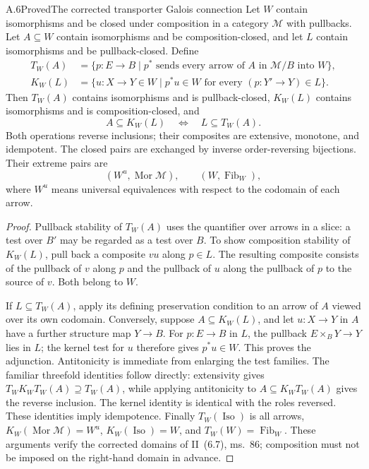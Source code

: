 \begin{claim}{A.6}{Proved}{The corrected transporter Galois connection}
Let $W$ contain isomorphisms and be closed under composition in a category $\mathcal M$ with pullbacks. Let $A\subseteq W$ contain isomorphisms and be composition-closed, and let $L$ contain isomorphisms and be pullback-closed. Define
\[
\begin{split}
T_W(A)&=\{p:E\to B\mid p^*\text{ sends every arrow of }A
\text{ in }\mathcal M/B\text{ into }W\},\\
K_W(L)&=\{u:X\to Y\in W\mid p^*u\in W
\text{ for every }(p:Y'\to Y)\in L\}.
\end{split}
\]
Then $T_W(A)$ contains isomorphisms and is pullback-closed, $K_W(L)$ contains isomorphisms and is composition-closed, and
\[
A\subseteq K_W(L)\quad\Longleftrightarrow\quad L\subseteq T_W(A).
\]
Both operations reverse inclusions; their composites are extensive, monotone, and idempotent. The closed pairs are exchanged by inverse order-reversing bijections. Their extreme pairs are
\[
(W^u,\operatorname{Mor}\mathcal M),\qquad
(W,\operatorname{Fib}_W),
\]
where $W^u$ means universal equivalences with respect to the codomain of each arrow.
\end{claim}
\begin{proof}
Pullback stability of $T_W(A)$ uses the quantifier over arrows in a slice: a test over $B'$ may be regarded as a test over $B$. To show composition stability of $K_W(L)$, pull back a composite $vu$ along $p\in L$. The resulting composite consists of the pullback of $v$ along $p$ and the pullback of $u$ along the pullback of $p$ to the source of $v$. Both belong to $W$.

If $L\subseteq T_W(A)$, apply its defining preservation condition to an arrow of $A$ viewed over its own codomain. Conversely, suppose $A\subseteq K_W(L)$, and let $u:X\to Y$ in $A$ have a further structure map $Y\to B$. For $p:E\to B$ in $L$, the pullback $E\times_B Y\to Y$ lies in $L$; the kernel test for $u$ therefore gives $p^*u\in W$. This proves the adjunction. Antitonicity is immediate from enlarging the test families. The familiar threefold identities follow directly: extensivity gives $T_WK_WT_W(A)\supseteq T_W(A)$, while applying antitonicity to $A\subseteq K_WT_W(A)$ gives the reverse inclusion. The kernel identity is identical with the roles reversed. These identities imply idempotence. Finally $T_W(\operatorname{Iso})$ is all arrows, $K_W(\operatorname{Mor}\mathcal M)=W^u$, $K_W(\operatorname{Iso})=W$, and $T_W(W)=\operatorname{Fib}_W$. These arguments verify the corrected domains of II~(6.7), ms.~86; composition must not be imposed on the right-hand domain in advance.
\end{proof}

